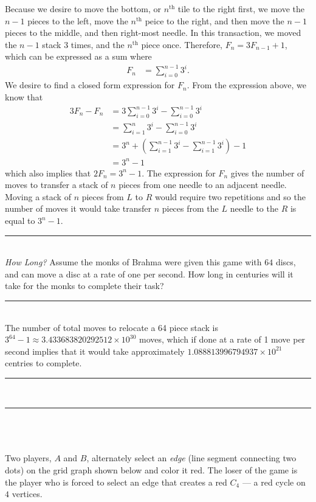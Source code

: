 \documentclass{article}
\newcommand{\problemsep}{\leavevmode\\[0.05in] \rule[\baselineskip/4]{\textwidth}{1pt} \\[0.005in] \rule[\baselineskip]{\textwidth}{1pt}\vspace{-\baselineskip/2}\leavevmode\\[0.05in]}
\newcommand{\statementsep}{\leavevmode\\[0.005in] \rule[\baselineskip/4]{\textwidth}{0.4pt}\leavevmode\\[0.005in]}
\begin{document}
Because we desire to move the bottom, or $n^{\text{th}}$ tile to the right first, we move the $n-1$ pieces to the left, move the $n^{\text{th}}$ peice to the right, and then move the $n-1$ pieces to the middle, and then right-most needle.  In this transaction, we moved the $n-1$ stack $3$ times, and the $n^{\text{th}}$ piece once.  Therefore, $F_{n} = 3F_{n-1} + 1$, which can be expressed as a sum where
\begin{equation*}\begin{aligned}
F_n &= \sum_{i=0}^{n - 1}3^i.
\end{aligned}\end{equation*}
We desire to find a closed form expression for $F_n$. From the expression above, we know that
\begin{equation*}\begin{aligned}
3F_n - F_n &= 3\sum_{i=0}^{n - 1}3^i - \sum_{i=0}^{n - 1}3^i \\
           &= \sum_{i=1}^n 3^i - \sum_{i=0}^{n-1}3^i\\
		   &= 3^n + \left ( \sum_{i=1}^{n-1}3^i - \sum_{i=1}^{n-1}3^i \right ) - 1 \\
		   &= 3^n - 1
\end{aligned}\end{equation*} 
which also implies that $ 2F_n = 3^n - 1$.
The expression for $F_n$ gives the number of moves to transfer a stack of $n$ pieces from one needle to an adjacent needle. Moving a stack of $n$ pieces from $L$ to $R$ would require two repetitions and so the number of moves it would take transfer $n$ pieces from the $L$ needle to the $R$ is equal to $3^n - 1$.
\statementsep
\noindent \emph{How Long?} Assume the monks of Brahma were given this game with 
$64$ discs, and can move a disc at a rate of one per second. How long in centuries 
will it take for the monks to complete their task?
\statementsep
The number of total moves to relocate a 64 piece stack is $3^{64} - 1 \approx 3.433683820292512\times 10^{30}$ moves, which if done at a rate of 1 move per second implies that it would take approximately $1.088813996794937 \times 10^{21}$ centries to complete.
\problemsep
{} \\
\\
\noindent Two players, $A$ and $B$, alternately select an \emph{edge} (line segment
connecting two dots) on the grid graph shown
below and color it red.
The loser of the game is the player who is forced to select an edge that creates
a red $C_4$ --- a red cycle on $4$ vertices.\\
\end{document}
